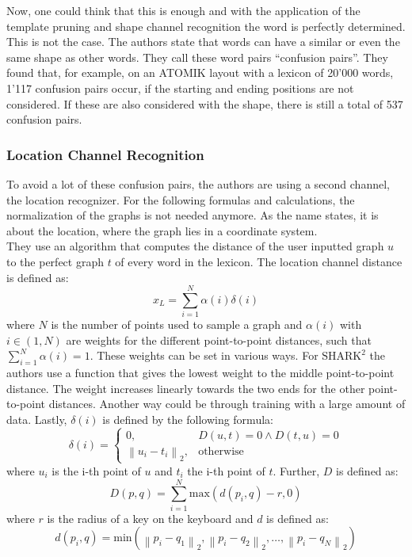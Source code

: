 Now, one could think that this is enough and with the application of the template pruning and shape channel recognition the word is perfectly determined. This is not the case. The authors state that words can have a similar or even the same shape as other words. They call these word pairs ``confusion pairs''. They found that, for example, on an ATOMIK layout with a lexicon of 20'000 words, 1'117 confusion pairs occur, if the starting and ending positions are not considered. If these are also considered with the shape, there is still a total of 537 confusion pairs. 

\subsubsection{Location Channel Recognition}
To avoid a lot of these confusion pairs, the authors are using a second channel, the location recognizer. For the following formulas and calculations, the normalization of the graphs is not needed anymore. As the name states, it is about the location, where the graph lies in a coordinate system.\\
They use an algorithm that computes the distance of the user inputted graph $u$ to the perfect graph $t$ of every word in the lexicon. The location channel distance is defined as:
\begin{equation}
    x_L = \sum_{i = 1}^{N}\alpha(i)\delta(i)
    \label{eqn:locationformula}
\end{equation}
where $N$ is the number of points used to sample a graph and $\alpha(i)$ with $i \in (1,N)$ are weights for the different point-to-point distances, such that $\sum_{i = 1}^{N}\alpha(i) = 1$. These weights can be set in various ways. For $\text{SHARK}^2$ the authors use a function that gives the lowest weight to the middle point-to-point distance. The weight increases linearly towards the two ends for the other point-to-point distances. Another way could be through training with a large amount of data. Lastly, $\delta(i)$ is defined by the following formula:
\begin{equation}
    \delta(i) =
        \begin{cases}
            0, & D(u,t) = 0 \land D(t,u) = 0 \\
            \left\lVert u_i - t_i \right\rVert_2, & \text{otherwise}
        \end{cases}
\end{equation}
where $u_i$ is the i-th point of $u$ and $t_i$ the i-th point of $t$. Further, $D$ is defined as:
\begin{equation}
    D(p,q) = \sum_{i = 1}^{N}\text{max}(d(p_i,q) - r,0)
\end{equation}
where $r$ is the radius of a key on the keyboard and $d$ is defined as:
\begin{equation}
    d(p_i,q) = \text{min}(\left\lVert p_i - q_1 \right\rVert_2, \left\lVert p_i - q_2 \right\rVert_2, \dots, \left\lVert p_i - q_N\right\rVert_2)
\end{equation}

